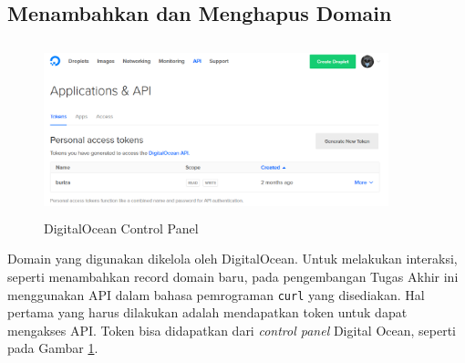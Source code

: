  		\subsection{Menambahkan dan Menghapus Domain}
        	\begin{figure}[H]
				\centering
				\includegraphics[width=10cm,height=5cm]{Images/C-4/docp.png}
				\caption{DigitalOcean Control Panel}
				\label{docp}
			\end{figure}
        	Domain yang digunakan dikelola oleh DigitalOcean. Untuk melakukan interaksi, seperti menambahkan record domain baru, pada pengembangan Tugas Akhir ini menggunakan API dalam bahasa pemrograman \texttt{curl} yang disediakan.
            \indent Hal pertama yang harus dilakukan adalah mendapatkan token untuk dapat mengakses API. Token bisa didapatkan dari \textit{control panel} Digital Ocean, seperti pada Gambar \ref{docp}.
        
